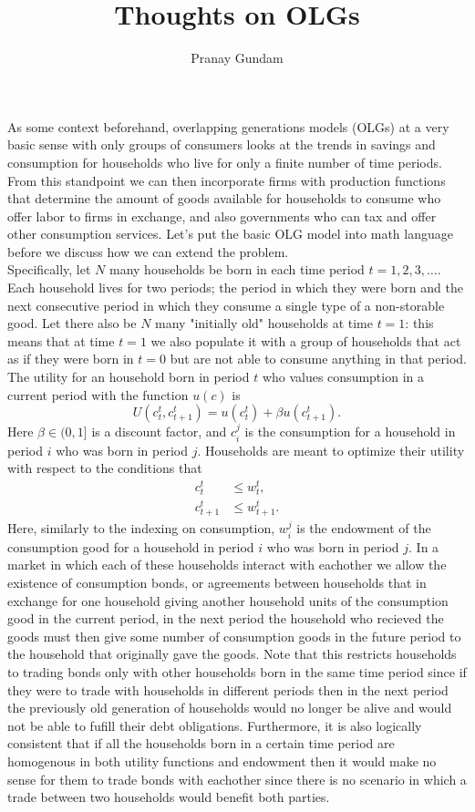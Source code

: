 \documentclass[11pt,english]{article}
\title{\textbf{Thoughts on OLGs}}
\author{Pranay Gundam}
\begin{document}
\maketitle

\noindent As some context beforehand, overlapping generations models (OLGs) at a very basic sense with only groups of consumers looks at the trends in savings and consumption for households who live for only a finite number of time periods. From this standpoint we can then incorporate firms with production functions that determine the amount of goods available for households to consume who offer labor to firms in exchange, and also governments who can tax and offer other consumption services. Let's put the basic OLG model into math language before we discuss how we can extend the problem.\\

\noindent Specifically, let $N$ many households be born in each time period $t=1,2,3,\ldots$. Each household lives for two periods; the period in which they were born and the next consecutive period in which they consume a single type of a non-storable good. Let there also be $N$ many "initially old" households at time $t=1$: this means that at time $t=1$ we also populate it with a group of households that act as if they were born in $t=0$ but are not able to consume anything in that period. The utility for an household born in period $t$ who values consumption in a current period with the function $u(c)$ is $$U\left(c_t^t, c_{t+1}^t\right) = u\left(c_t^t\right) + \beta u\left(c_{t+1}^t\right).$$ Here $\beta\in (0,1]$ is a discount factor, and $c_i^j$ is the consumption for a household in period $i$ who was born in period $j$. Households are meant to optimize their utility with respect to the conditions that \begin{align*}c_t^{t} &\leq w_t^t,\\ 
c_{t+1}^t &\leq w_{t+1}^t.\end{align*} Here, similarly to the indexing on consumption, $w_i^j$ is the endowment of the consumption good for a household in period $i$ who was born in period $j$. In a market in which each of these households interact with eachother we allow the existence of consumption bonds, or agreements between households that in exchange for one household giving another household units of the consumption good in the current period, in the next period the household who recieved the goods must then give some number of consumption goods in the future period to the household that originally gave the goods. Note that this restricts households to trading bonds only with other households born in the same time period since if they were to trade with households in different periods then in the next period the previously old generation of households would no longer be alive and would not be able to fufill their debt obligations. Furthermore, it is also logically consistent that if all the households born in a certain time period are homogenous in both utility functions and endowment then it would make no sense for them to trade bonds with eachother since there is no scenario in which a trade between two households would benefit both parties.\\
\end{document}
